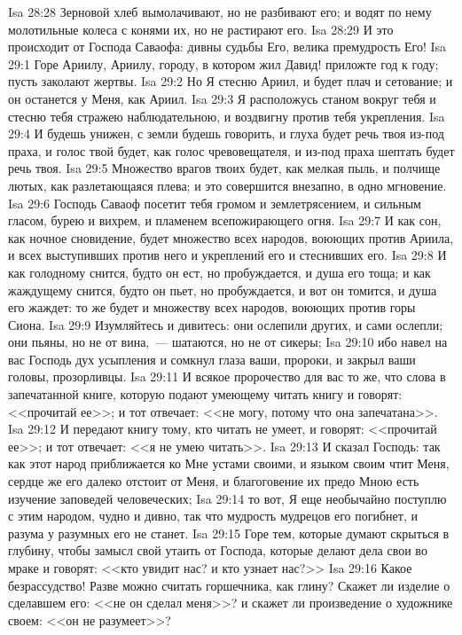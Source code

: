 \vs Isa 28:28 Зерновой хлеб вымолачивают, но не разбивают его; и водят по нему молотильные колеса с конями их, но не растирают его.
\vs Isa 28:29 И это происходит от Господа Саваофа: дивны судьбы Его, велика премудрость Его!
\vs Isa 29:1 Горе Ариилу, Ариилу, городу, в котором жил Давид! приложте год к году; пусть заколают жертвы.
\vs Isa 29:2 Но Я стесню Ариил, и будет плач и сетование; и он останется у Меня, как Ариил.
\vs Isa 29:3 Я расположусь станом вокруг тебя и стесню тебя стражею наблюдательною, и воздвигну против тебя укрепления.
\vs Isa 29:4 И будешь унижен, с земли будешь говорить, и глуха будет речь твоя из-под праха, и голос твой будет, как голос чревовещателя, и из-под праха шептать будет речь твоя.
\vs Isa 29:5 Множество врагов твоих будет, как мелкая пыль, и полчище лютых, как разлетающаяся плева; и это совершится внезапно, в одно мгновение.
\vs Isa 29:6 Господь Саваоф посетит тебя громом и землетрясением, и сильным гласом, бурею и вихрем, и пламенем всепожирающего огня.
\vs Isa 29:7 И как сон, как ночное сновидение, будет множество всех народов, воюющих против Ариила, и всех выступивших против него и укреплений его и стеснивших его.
\vs Isa 29:8 И как голодному снится, будто он ест, но пробуждается, и душа его тоща; и как жаждущему снится, будто он пьет, но пробуждается, и вот он томится, и душа его жаждет: то же будет и множеству всех народов, воюющих против горы Сиона.
\vs Isa 29:9 Изумляйтесь и дивитесь: они ослепили других, и сами ослепли; они пьяны, но не от вина,~--- шатаются, но не от сикеры;
\vs Isa 29:10 ибо навел на вас Господь дух усыпления и сомкнул глаза ваши, пророки, и закрыл ваши головы, прозорливцы.
\vs Isa 29:11 И всякое пророчество для вас то же, что слова в запечатанной книге, которую подают умеющему читать книгу и говорят: <<прочитай ее>>; и тот отвечает: <<не могу, потому что она запечатана>>.
\vs Isa 29:12 И передают книгу тому, кто читать не умеет, и говорят: <<прочитай ее>>; и тот отвечает: <<я не умею читать>>.
\rsbpar\vs Isa 29:13 И сказал Господь: так как этот народ приближается ко Мне устами своими, и языком своим чтит Меня, сердце же его далеко отстоит от Меня, и благоговение их предо Мною есть изучение заповедей человеческих;
\vs Isa 29:14 то вот, Я еще необычайно поступлю с этим народом, чудно и дивно, так что мудрость мудрецов его погибнет, и разума у разумных его не станет.
\vs Isa 29:15 Горе тем, которые думают скрыться в глубину, чтобы замысл свой утаить от Господа, которые делают дела свои во мраке и говорят: <<кто увидит нас? и кто узнает нас?>>
\vs Isa 29:16 Какое безрассудство! Разве можно считать горшечника, как глину? Скажет ли изделие о сделавшем его: <<не он сделал меня>>? и скажет ли произведение о художнике своем: <<он не разумеет>>?

